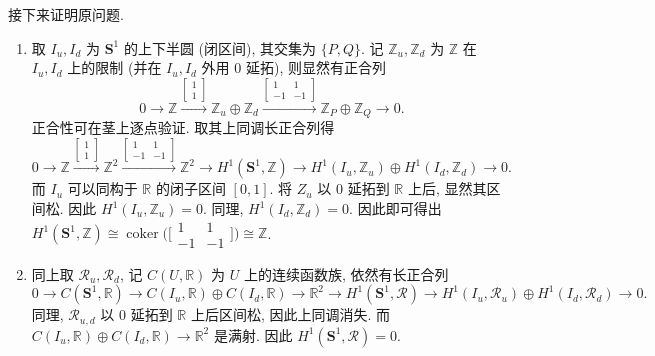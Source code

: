 \documentclass{article}
\theoremstyle{exercise}
\theoremstyle{plain}
\theoremstyle{remark}
\newenvironment{proofc}{\proof}{\endproof}
\def\Z{\mathbb{Z}}
\def\R{\mathbb{R}}
\def\bS{\mathbf{S}}
\def\cR{\mathscr{R}}
\def\coker{\operatorname{coker}}
\begin{document}
\begin{proofc}
  接下来证明原问题.
  \begin{enumerate}[label=(\arabic*)]
    \item 取 $I_u, I_d$ 为 $\bS^1$ 的上下半圆 (闭区间), 其交集为 $\{P, Q\}$.
          记 $\Z_u, \Z_d$ 为 $\Z$ 在 $I_u, I_d$ 上的限制 (并在 $I_u, I_d$ 外用 $0$ 延拓), 则显然有正合列
          \[
          0 \to \Z \xrightarrow{\begin{bmatrix} 1 \\ 1 \end{bmatrix}} \Z_u \oplus \Z_d \xrightarrow{\begin{bmatrix} 1 & 1 \\ -1 & -1 \end{bmatrix}} \Z_P \oplus \Z_Q \to 0.
          \]
          正合性可在茎上逐点验证. 取其上同调长正合列得
          \[
          0 \to \Z \xrightarrow{\begin{bmatrix} 1 \\ 1 \end{bmatrix}} \Z^2 \xrightarrow{\begin{bmatrix} 1 & 1 \\ -1 & -1 \end{bmatrix}} \Z^2
          \to H^1(\bS^1, \Z) \to H^1(I_u, \Z_u) \oplus H^1(I_d, \Z_d) \to 0.
          \]
          而 $I_u$ 可以同构于 $\R$ 的闭子区间 $[0, 1]$. 将 $Z_u$ 以 $0$ 延拓到 $\R$ 上后, 显然其区间松. 因此 $H^1(I_u, \Z_u) = 0$.
          同理, $H^1(I_d, \Z_d) = 0$. 因此即可得出 $H^1(\bS^1, \Z) \cong \coker\bigl(\bigl[\begin{smallmatrix} 1 & 1 \\ -1 & -1 \end{smallmatrix}\bigr]\bigr) \cong \Z$.
    \item 同上取 $\cR_u, \cR_d$, 记 $C(U, \R)$ 为 $U$ 上的连续函数族, 依然有长正合列
          \[
          0 \to C(\bS^1, \R) \to C(I_u, \R) \oplus C(I_d, \R) \to \R^2
          \to H^1(\bS^1, \cR) \to H^1(I_u, \cR_u) \oplus H^1(I_d, \cR_d) \to 0.
          \]
          同理, $\cR_{u, d}$ 以 $0$ 延拓到 $\R$ 上后区间松, 因此上同调消失. 而 $C(I_u, \R) \oplus C(I_d, \R) \to \R^2$ 是满射.
          因此 $H^1(\bS^1, \cR) = 0$. \qedhere
  \end{enumerate}
\end{proofc}
\end{document}
